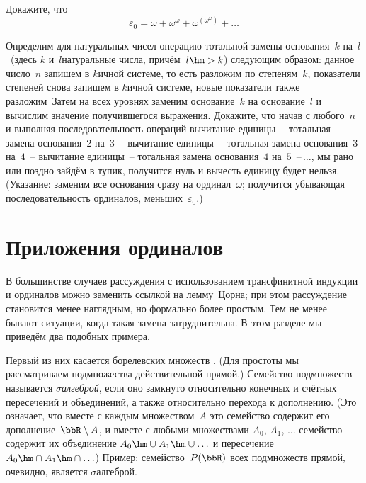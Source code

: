 \begin{problem}
Докажите, что
        $$
\varepsilon_0 = \omega + \omega^\omega + \omega^{(\omega^\omega)}+\ldots
        $$
\end{problem}

\begin{problem}
Определим для натуральных чисел операцию  тотальной замены основания~$k$
на~$l$\ (здесь $k$ и~$l$\т натуральные числа, причём~$l\hm>k$)
следующим образом: данное число~$n$ запишем в $k$\д ичной системе, то есть
разложим по степеням~$k$, показатели степеней снова запишем в $k$\д ичной
системе, новые показатели также разложим~ Затем на всех уровнях
заменим основание~$k$ на основание~$l$ и вычислим значение получившегося
выражения. Докажите, что начав с любого~$n$ и выполняя последовательность
операций  вычитание
единицы~-- тотальная замена основания~$2$ на~$3$~--
вычитание единицы~-- тотальная замена основания~$3$ на~$4$~--
вычитание единицы~-- тотальная замена основания~$4$ на~$5$~--\,$\dots$,
мы рано или поздно зайдём в тупик, 
получится нуль и вычесть единицу будет
нельзя. (Указание: заменим все основания сразу на ординал~$\omega$; получится
убывающая последовательность ординалов, меньших~$\varepsilon_0$.)
\end{problem}

\section{Приложения ординалов}

В большинстве случаев рассуждения с использованием трансфинитной
индукции и ординалов можно заменить ссылкой на
лемму~Цорна; при этом рассуждение становится
менее наглядным, но формально более простым. Тем не менее бывают
ситуации, когда такая замена затруднительна. В этом разделе мы
приведём два подобных примера.

Первый из них касается борелевских множеств%
. (Для простоты мы
рассматриваем подмножества действительной прямой.) Семейство
подмножеств называется
$\sigma$\д\emph{алгеброй}, если
оно замкнуто относительно
конечных и счётных пересечений и объединений, а также
относительно перехода к дополнению. (Это означает, что вместе с
каждым множеством~$A$ это семейство содержит его
дополнение~$\bbR\setminus A$, и вместе с любыми множествами
$A_0$, $A_1$, $\dots$ семейство содержит их объединение $A_0\hm\cup
A_1\hm\cup\ldots$ и пересечение $A_0\hm\cap A_1\hm\cap\ldots$) Пример:
семейство~$P(\bbR)$ всех подмножеств прямой, очевидно, является
$\sigma$\д алгеброй.

